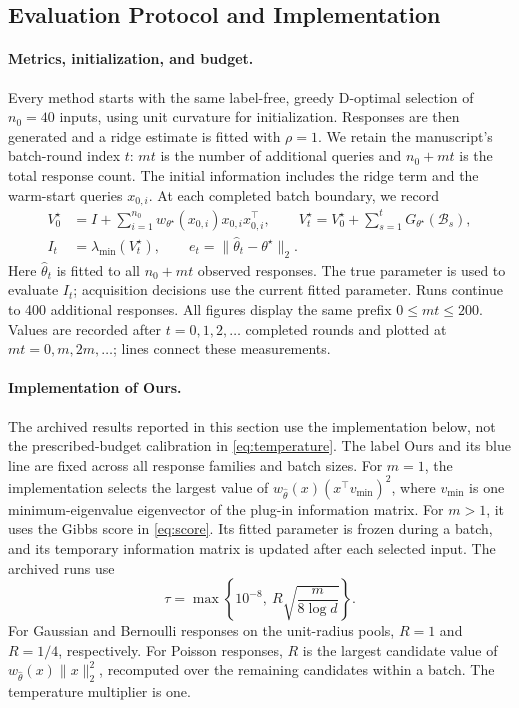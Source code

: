 \documentclass[10pt,twoside,letterpaper]{article}
\newcommand{\norm}[1]{\lVert #1\rVert}
\newcommand{\thetahat}{\widehat\theta}
\begin{document}
\subsection{Evaluation Protocol and Implementation}
\label{app:experiment-protocol}

\paragraph{Metrics, initialization, and budget.}
Every method starts with the same label-free, greedy D-optimal selection
of $n_0=40$ inputs, using unit curvature for initialization. Responses
are then generated and a ridge estimate is fitted with $\rho=1$.
We retain the manuscript's batch-round index $t$: $mt$ is the number
of additional queries and $n_0+mt$ is the total response count.
The initial information includes the ridge term and the warm-start
queries $x_{0,i}$. At each completed batch boundary, we record
\begin{equation}
  \begin{aligned}
    V_0^\star&=I+\sum_{i=1}^{n_0}
      w_{\theta^\star}(x_{0,i})x_{0,i}x_{0,i}^\top,\qquad
    V_t^\star=V_0^\star+\sum_{s=1}^t G_{\theta^\star}(\mathcal B_s),\\
    I_t&=\lambda_{\min}(V_t^\star),\qquad
    e_t=\norm{\thetahat_t-\theta^\star}_2.
  \end{aligned}
  \label{eq:experimental-metrics}
\end{equation}
Here $\thetahat_t$ is fitted to all $n_0+mt$ observed responses.
The true parameter is used to evaluate $I_t$; acquisition decisions
use the current fitted parameter. Runs continue to 400 additional
responses. All figures display the same prefix $0\le mt\le200$.
Values are recorded after $t=0,1,2,\ldots$ completed rounds and plotted
at $mt=0,m,2m,\ldots$; lines connect these measurements.

\paragraph{Implementation of Ours.}
The archived results reported in this section use the implementation
below, not the prescribed-budget calibration in \eqref{eq:temperature}.
The label Ours and its blue line are fixed across all response families
and batch sizes. For $m=1$, the implementation selects the largest value of
$w_{\widehat\theta}(x)(x^\top v_{\min})^2$, where $v_{\min}$ is one
minimum-eigenvalue eigenvector of the plug-in information matrix.
For $m>1$, it uses the Gibbs score in \eqref{eq:score}. Its fitted parameter
is frozen during a batch, and its temporary information matrix is
updated after each selected input. The archived runs use
\begin{equation}
  \tau=\max\!\left\{10^{-8},\ R\sqrt{\frac{m}{8\log d}}\right\}.
  \label{eq:experimental-temperature}
\end{equation}
For Gaussian and Bernoulli responses on the unit-radius pools,
$R=1$ and $R=1/4$, respectively. For Poisson responses, $R$ is the
largest candidate value of
$w_{\widehat\theta}(x)\norm{x}_2^2$, recomputed over the remaining
candidates within a batch. The temperature multiplier is one.
\end{document}
